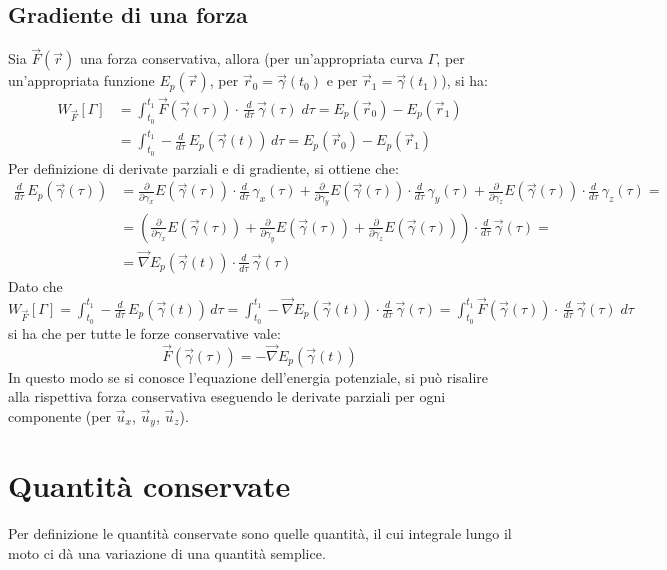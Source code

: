 \documentclass[a4paper]{article}
\newcommand\ux{\vec{u}_x}
\newcommand\uy{\vec{u}_y}
\newcommand\uz{\vec{u}_z}
\newcommand\dtau{\frac{d}{d\tau}\,}
\begin{document}
\subsection{Gradiente di una forza}
Sia \(\vec{F}(\vec{r})\) una forza conservativa, allora (per un'appropriata curva \(\Gamma\), per un'appropriata funzione \(E_p(\vec{r})\), per \(\vec{r}_0 = \vec{\gamma}(t_0)\) e per \(\vec{r}_1 = \vec{\gamma}(t_1)\)), si ha:
\begin{align*}
	W_{\vec{F}}[\Gamma] &= \int_{t_0}^{t_1} \vec{F}(\vec{\gamma}(\tau)) \cdot \, \dtau \vec{\gamma}(\tau) \; d\tau = E_p(\vec{r}_0) - E_p(\vec{r}_1) \\
	&= \int_{t_0}^{t_1} -\dtau E_p(\vec{\gamma}(t)) \, d\tau = E_p(\vec{r}_0) - E_p(\vec{r}_1)
\end{align*}
Per definizione di derivate parziali e di gradiente, si ottiene che:
\begin{align*}
	\dtau E_p(\vec{\gamma}(\tau)) &= \frac{\partial}{\partial \gamma_x} E(\vec{\gamma}(\tau)) \cdot \dtau \gamma_x(\tau) + \frac{\partial}{\partial \gamma_y} E(\vec{\gamma}(\tau)) \cdot \dtau \gamma_y(\tau) + \frac{\partial}{\partial \gamma_z} E(\vec{\gamma}(\tau)) \cdot \dtau \gamma_z(\tau) = \\
	&= \left( \frac{\partial}{\partial \gamma_x} E(\vec{\gamma}(\tau)) + \frac{\partial}{\partial \gamma_y} E(\vec{\gamma}(\tau)) + \frac{\partial}{\partial \gamma_z} E(\vec{\gamma}(\tau)) \right) \cdot \dtau \vec{\gamma}(\tau) = \\
	&= \vec{\nabla} E_p(\vec{\gamma}(t)) \cdot \dtau \vec{\gamma}(\tau)
\end{align*}
Dato che \(\displaystyle W_{\vec{F}}[\Gamma] = \int_{t_0}^{t_1} -\dtau E_p(\vec{\gamma}(t)) \, d\tau = \int_{t_0}^{t_1} -\vec{\nabla} E_p(\vec{\gamma}(t)) \cdot \dtau \vec{\gamma}(\tau) = \int_{t_0}^{t_1} \vec{F}(\vec{\gamma}(\tau)) \cdot \, \dtau \vec{\gamma}(\tau) \; d\tau\) \\
si ha che per tutte le forze conservative vale: \[\vec{F}(\vec{\gamma}(\tau)) = -\vec{\nabla} E_p(\vec{\gamma}(t))\]
In questo modo se si conosce l'equazione dell'energia potenziale, si può risalire alla rispettiva forza conservativa eseguendo
le derivate parziali per ogni componente (per \(\ux\), \(\uy\), \(\uz\)).

\newpage

\section{Quantità conservate}
Per definizione le quantità conservate sono quelle quantità, il cui integrale lungo il moto ci dà una variazione di una quantità semplice.
\end{document}
